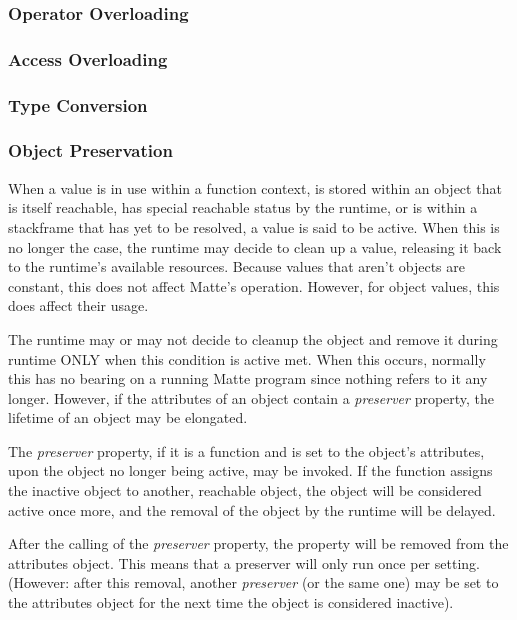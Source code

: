\documentclass[12pt,letterpaper]{report}
\begin{document}
\subsubsection{Operator Overloading}\label{Operator Overloading}
\subsubsection{Access Overloading}\label{Access Overloading}
\subsubsection{Type Conversion}\label{Type Conversion}
\subsubsection{Object Preservation}\label{Object Preservation}

When a value is in use within a function context, is stored within an object that is itself 
reachable, has special reachable status by the runtime,
or is within a stackframe that has yet to be resolved, a value is said to be active. 
When this is no longer the case, the runtime may decide to clean up a value, releasing it back 
to the runtime's available resources. Because values that aren't objects are constant, this 
does not affect Matte's operation. However, for object values, this does affect their usage.

The runtime may or may not decide to cleanup the object and remove it during runtime ONLY when 
this condition is active met. When this occurs, normally this has no bearing on a running Matte program 
since nothing refers to it any longer. However, if the attributes of an object contain a 
\textit{preserver} property, the lifetime of an object may be elongated.

The \textit{preserver} property, if it is a function and is set to the object's attributes, 
upon the object no longer being active, may be invoked. If the function assigns the inactive object 
to another, reachable object, the object will be considered active once more, and the removal 
of the object by the runtime will be delayed.

After the calling of the \textit{preserver} property, the property will be removed from the 
attributes object. This means that a preserver will only run once per setting. (However: after this removal, another 
\textit{preserver} (or the same one) may be set to the attributes object for the next time 
the object is considered inactive).
\end{document}
